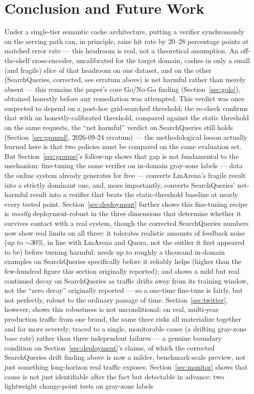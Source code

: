 \documentclass[11pt]{article}
\begin{document}
\section{Conclusion and Future Work}
\label{sec:conclusion}

Under a single-tier semantic cache architecture, putting a verifier synchronously on the serving path can, in principle, raise hit rate by 20--28 percentage points at matched error rate --- this headroom is real, not a theoretical assumption. An off-the-shelf cross-encoder, uncalibrated for the target domain, cashes in only a small (and fragile) slice of that headroom on one dataset, and on the other (SearchQueries, corrected, see erratum above) is net harmful rather than merely absent --- this remains the paper's core Go/No-Go finding (Section~\ref{sec:golo}), obtained honestly before any remediation was attempted. This verdict was once suspected to depend on a post-hoc grid-searched threshold; the re-check confirms that with an honestly-calibrated threshold, compared against the static threshold on the same requests, the ``net harmful'' verdict on SearchQueries still holds (Section~\ref{sec:groupd}, 2026-09-24 erratum) --- the methodological lesson actually learned here is that two policies must be compared on the same evaluation set. But Section~\ref{sec:groupe}'s follow-up shows that gap is not fundamental to the mechanism: fine-tuning the same verifier on in-domain gray-zone labels --- data the online system already generates for free --- converts LmArena's fragile result into a strictly dominant one, and, more importantly, converts SearchQueries' net-harmful result into a verifier that beats the static-threshold baseline at nearly every tested point. Section~\ref{sec:deployment} further shows this fine-tuning recipe is \emph{mostly} deployment-robust in the three dimensions that determine whether it survives contact with a real system, though the corrected SearchQueries numbers now show real limits on all three: it tolerates realistic amounts of feedback noise (up to $\sim$30\%, in line with LmArena and Quora, not the outlier it first appeared to be) before turning harmful; needs up to roughly a thousand in-domain examples on SearchQueries specifically before it reliably helps (higher than the few-hundred figure this section originally reported); and shows a mild but real continued decay on SearchQueries as traffic drifts away from its training window, not the ``zero decay'' originally reported --- so a one-time fine-tune is fairly, but not perfectly, robust to the ordinary passage of time. Section~\ref{sec:twitter}, however, shows this robustness is not unconditional: on real, multi-year production traffic from one brand, the same three risks all materialize together and far more severely, traced to a single, monitorable cause (a drifting gray-zone base rate) rather than three independent failures --- a genuine boundary condition on Section~\ref{sec:deployment}'s claims, of which the corrected SearchQueries drift finding above is now a milder, benchmark-scale preview, not just something long-horizon real traffic exposes. Section~\ref{sec:monitor} shows that cause is not just identifiable after the fact but detectable in advance: two lightweight change-point tests on gray-zone labels 
\end{document}
